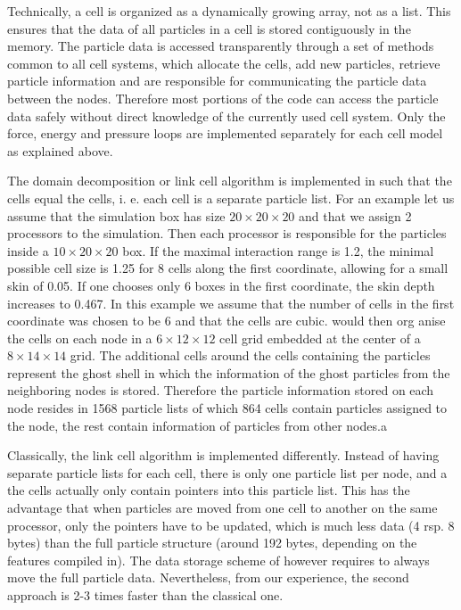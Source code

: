 Technically, a cell is organized as a dynamically growing array, not
as a list. This ensures that the data of all particles in a cell is
stored contiguously in the memory. The particle data is accessed
transparently through a set of methods common to all cell systems,
which allocate the cells, add new particles, retrieve particle
information and are responsible for communicating the particle data
between the nodes. Therefore most portions of the code can access the
particle data safely without direct knowledge of the currently used
cell system. Only the force, energy and pressure loops are implemented
separately for each cell model as explained above.

The domain decomposition or link cell algorithm is implemented in
\es{} such that the cells equal the \es{} cells, i. e. each cell is a
separate particle list. For an example let us assume that the
simulation box has size $20\times 20\times 20$ and that we assign 2
processors to the simulation. Then each processor is responsible for
the particles inside a $10\times 20\times 20$ box. If the maximal
interaction range is 1.2, the minimal possible cell size is 1.25 for 8
cells along the first coordinate, allowing for a small skin of 0.05.
If one chooses only 6 boxes in the first coordinate, the skin depth
increases to 0.467. In this example we assume that the number of cells
in the first coordinate was chosen to be 6 and that the cells are
cubic. \es{} would then org anise the cells on each node in a $6\times
12\times 12$ cell grid embedded at the center of a $8\times 14 \times
14$ grid. The additional cells around the cells containing the
particles represent the ghost shell in which the information of the
ghost particles from the neighboring nodes is stored. Therefore the
particle information stored on each node resides in 1568 particle
lists of which 864 cells contain particles assigned to the node, the
rest contain information of particles from other nodes.a

Classically, the link cell algorithm is implemented differently.
Instead of having separate particle lists for each cell, there is only
one particle list per node, and a the cells actually only contain
pointers into this particle list. This has the advantage that when
particles are moved from one cell to another on the same processor,
only the pointers have to be updated, which is much less data (4 rsp.
8 bytes) than the full particle structure (around 192 bytes, depending
on the features compiled in). The data storage scheme of \es{} however
requires to always move the full particle data. Nevertheless, from our
experience, the second approach is 2-3 times faster than the classical
one.

